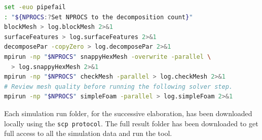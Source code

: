\begin{lstlisting}[language=bash,numbers=none,caption={Illustrative parallel execution sequence after environment setup.}]
set -euo pipefail
: "${NPROCS:?Set NPROCS to the decomposition count}"
blockMesh > log.blockMesh 2>&1
surfaceFeatures > log.surfaceFeatures 2>&1
decomposePar -copyZero > log.decomposePar 2>&1
mpirun -np "$NPROCS" snappyHexMesh -overwrite -parallel \
  > log.snappyHexMesh 2>&1
mpirun -np "$NPROCS" checkMesh -parallel > log.checkMesh 2>&1
# Review mesh quality before running the following solver step.
mpirun -np "$NPROCS" simpleFoam -parallel > log.simpleFoam 2>&1
\end{lstlisting}

Each simulation run folder, for the successive elaboration, has been downloaded locally using the \texttt{scp protocol}. The full result folder has been downloaded to get full access to all the simulation data and run the tool. 






